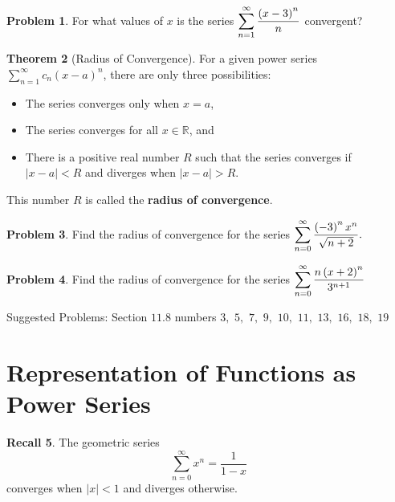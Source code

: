 \documentclass[letterpaper, twoside, 12pt]{book}
\theoremstyle{definition}
\newtheorem{theorem}{Theorem}
\newtheorem{recall}[theorem]{Recall}
\theoremstyle{definition}
\newtheorem{problem}[theorem]{Problem}
\newcommand{\ds}{\ensuremath{\displaystyle}}
\begin{document}
\vfill

\begin{problem}
 For what values of $x$ is the series $\ds \sum_{n=1}^{\infty} \frac{\left(x-3\right)^n}{n}$ convergent?
\end{problem}

\vfill

\newpage

\begin{theorem}[Radius of Convergence]
 For a given power series $\sum_{n=1}^{\infty} c_n\left(x-a\right)^n$, there are only three possibilities:
 \begin{itemize}
  \item The series converges only when $x=a$,
  \item The series converges for all $x \in \mathbb{R}$, and
  \item There is a positive real number $R$ such that the series converges if
   $\left|x-a\right| < R$ and diverges when $\left|x-a\right| > R$.
 \end{itemize}
 This number $R$ is called the \textbf{radius of convergence}.
\end{theorem}

\begin{problem}
 Find the radius of convergence for the series $\ds \sum_{n=0}^{\infty} \frac{\left(-3\right)^n x^n}{\sqrt{n+2}}.$
\end{problem}

\vfill

\begin{problem}
 Find the radius of convergence for the series $\ds \sum_{n=0}^{\infty} \frac{n\left(x+2\right)^n}{3^{n+1}}$
\end{problem}

\vfill

\noindent Suggested Problems: Section $11.8$ numbers $3,$ $5,$ $7,$ $9,$ $10,$ $11,$ $13,$ $16,$ $18,$ $19$

\newpage

\section{Representation of Functions as Power Series}

\begin{recall}
 The geometric series $$\sum_{n=0}^{\infty} x^n = \frac{1}{1-x}$$
 converges when $\left|x\right| < 1$ and diverges otherwise.
\end{recall}
\end{document}
